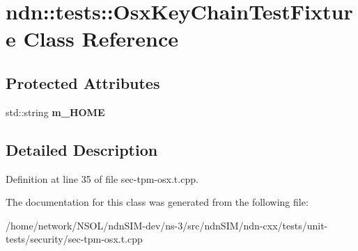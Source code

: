 \hypertarget{classndn_1_1tests_1_1OsxKeyChainTestFixture}{}\section{ndn\+:\+:tests\+:\+:Osx\+Key\+Chain\+Test\+Fixture Class Reference}
\label{classndn_1_1tests_1_1OsxKeyChainTestFixture}
\subsection*{Protected Attributes}
\begin{DoxyCompactItemize}
\item 
std\+::string {\bfseries m\+\_\+\+H\+O\+ME}\hypertarget{classndn_1_1tests_1_1OsxKeyChainTestFixture_a01f1a84aa228b03564b246cfc1a53823}{}\label{classndn_1_1tests_1_1OsxKeyChainTestFixture_a01f1a84aa228b03564b246cfc1a53823}

\end{DoxyCompactItemize}


\subsection{Detailed Description}


Definition at line 35 of file sec-\/tpm-\/osx.\+t.\+cpp.



The documentation for this class was generated from the following file\+:\begin{DoxyCompactItemize}
\item 
/home/network/\+N\+S\+O\+L/ndn\+S\+I\+M-\/dev/ns-\/3/src/ndn\+S\+I\+M/ndn-\/cxx/tests/unit-\/tests/security/sec-\/tpm-\/osx.\+t.\+cpp\end{DoxyCompactItemize}
